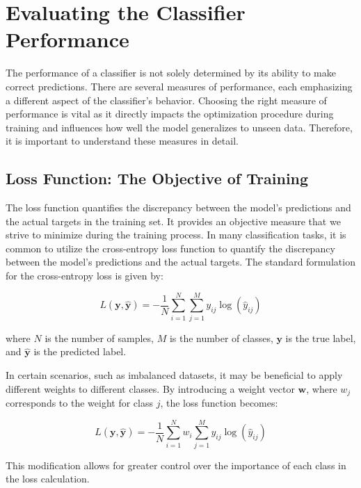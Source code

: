 \section{Evaluating the Classifier Performance}

The performance of a classifier is not solely determined by its ability to make correct predictions. There are several
measures of performance, each emphasizing a different aspect of the classifier's behavior. Choosing the right measure of
performance is vital as it directly impacts the optimization procedure during training and influences how well the model
generalizes to unseen data. Therefore, it is important to understand these measures in detail.

\subsection{Loss Function: The Objective of Training}

The loss function quantifies the discrepancy between the model's predictions and the actual targets in the training set.
It provides an objective measure that we strive to minimize during the training process.  In many classification tasks,
it is common to utilize the cross-entropy loss function to quantify the discrepancy between the model's predictions and
the actual targets. The standard formulation for the cross-entropy loss is given by:

\begin{equation}
    L(\mathbf{y}, \mathbf{\hat{y}}) = -\frac{1}{N}\sum_{i=1}^{N}\sum_{j=1}^{M} y_{ij} \log(\hat{y}_{ij})
\end{equation}

where \( N \) is the number of samples, \( M \) is the number of classes, \( \mathbf{y} \) is the true label, and \(
\mathbf{\hat{y}} \) is the predicted label.

In certain scenarios, such as imbalanced datasets, it may be beneficial to apply different weights to different classes.
By introducing a weight vector \(\mathbf{w}\), where \( w_j \) corresponds to the weight for class \( j \), the loss
function becomes:

\begin{equation}
    L(\mathbf{y}, \mathbf{\hat{y}}) = -\frac{1}{N}\sum_{i=1}^{N} w_i \sum_{j=1}^{M} y_{ij} \log(\hat{y}_{ij})
\end{equation}

This modification allows for greater control over the importance of each class in the loss calculation.

